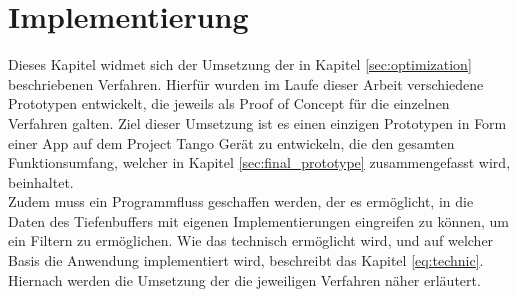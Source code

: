 \chapter{Implementierung} \label{sec:implementation}

Dieses Kapitel widmet sich der Umsetzung der in Kapitel \ref{sec:optimization} beschriebenen Verfahren. Hierfür wurden im Laufe dieser Arbeit verschiedene Prototypen entwickelt, die jeweils als Proof of Concept für die einzelnen Verfahren galten. Ziel dieser Umsetzung ist es einen einzigen Prototypen in Form einer App auf dem Project Tango Gerät zu entwickeln, die den gesamten Funktionsumfang, welcher in Kapitel \ref{sec:final_prototype} zusammengefasst wird, beinhaltet. \\

Zudem muss ein Programmfluss geschaffen werden, der es ermöglicht, in die Daten des Tiefenbuffers mit eigenen Implementierungen eingreifen zu können, um ein Filtern zu ermöglichen. Wie das technisch ermöglicht wird, und auf welcher Basis die Anwendung implementiert wird, beschreibt das Kapitel \ref{eq:technic}. Hiernach werden die Umsetzung der die jeweiligen Verfahren näher erläutert.










